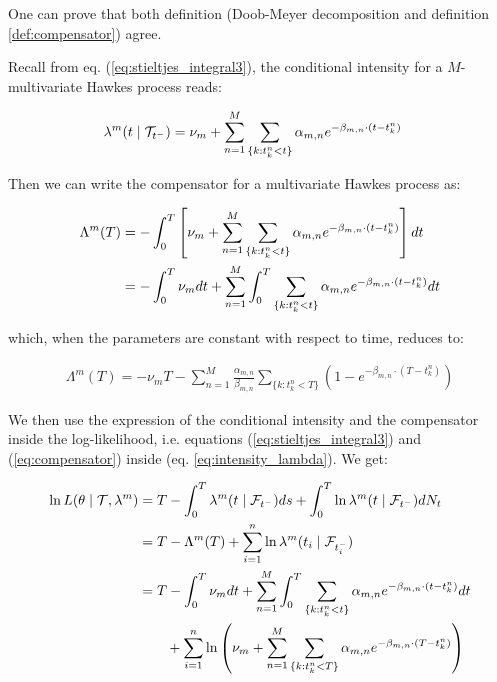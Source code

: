 One can prove that both definition (Doob-Meyer decomposition and definition \ref{def:compensator}) agree.

Recall from eq. (\ref{eq:stieltjes_integral3}), the conditional intensity for a $M$-multivariate Hawkes process reads:

\begin{align}
\lambda^{m} (t \mid \mathcal{T}_{t^-} ) &= 
\nu_m + \sum_{n = 1}^M \sum_{ \{k: t_k^n < t \}} \alpha_{m,n} e^{- \beta_{m,n} \cdot ( t - t_k^n ) } 
\end{align}


Then we can write the compensator for a multivariate Hawkes process as:

\begin{align}
\Lambda^{m}(T) &= - \int_0^T \left [ \nu_m + \sum_{n = 1}^M \sum_{ \{k: t_k^n < t \}} \alpha_{m,n} e^{- \beta_{m,n} \cdot ( t - t_k^n ) } \right ] dt \notag \\
&=  - \int_0^T \nu_m dt  + \sum_{n = 1}^M  \int_0^T \sum_{ \{k: t_k^n < t \}} \alpha_{m,n} e^{- \beta_{m,n} \cdot ( t - t_k^n ) } dt
\label{eq:compensator}
\end{align}

which, when the parameters are constant with respect to time, reduces to:

\begin{align}
\Lambda^{m}(T) = - \nu_m T  - \sum_{n = 1}^M  \frac{\alpha_{m,n}}{ \beta_{m,n} } \sum_{ \{k: t_k^n < T \}} \left ( 1 - e^{- \beta_{m,n} \cdot ( T - t_k^n ) }  \right ) 
\label{eq:compensator_constant}
\end{align}

We then use the expression of the conditional intensity and the compensator inside the log-likelihood, i.e. equations (\ref{eq:stieltjes_integral3}) and (\ref{eq:compensator}) inside (eq. \ref{eq:intensity_lambda}). We get:


\begin{align}
\ln L( \theta \mid \mathcal{T}, \lambda^{m} ) &=  T - \int_0^T \lambda^m(t \mid \mathcal F_{t^-}) ds + \int_0^T  \ln \lambda^{m}(t \mid \mathcal F_{t^-} )d N_t  \notag \\
&= T - \Lambda^{m}(T) + \sum_{i=1}^n  \ln \lambda^{m}(t_i \mid \mathcal F_{t_i^-} ) \notag \\
&= 
T - \int_0^T \nu_m dt  + \sum_{n = 1}^M  \int_0^T \sum_{ \{k: t_k^n < t \}}  \alpha_{m,n} e^{- \beta_{m,n} \cdot ( t - t_k^n ) } dt \notag
\\ &  \qquad + \sum_{i=1}^n  \ln \left ( 
\nu_m + \sum_{n = 1}^M \sum_{ \{k: t_k^n < T \}} \alpha_{m,n} e^{- \beta_{m,n} \cdot ( T - t_k^n ) }
\right ) 
\end{align}

